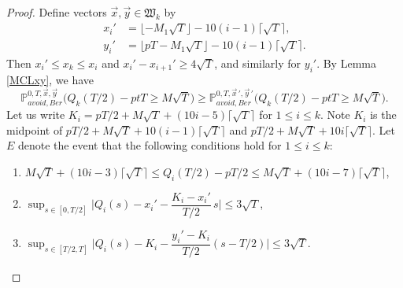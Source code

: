 \begin{proof}
	Define vectors $\vec{x},\vec{y}\in\mathfrak{W}_k$ by
	\begin{align*}
	x_i' &= \lfloor - M_1\sqrt{T} \rfloor - 10(i-1)\lceil\sqrt{T}\rceil,\\
	y_i' &= \lfloor pT - M_1\sqrt{T}\rfloor - 10(i-1)\lceil\sqrt{T}\rceil.
	\end{align*}
	Then $x_i'\leq x_k \leq x_i$ and $x_i'-x_{i+1}'\geq 4\sqrt{T}$, and similarly for $y_i'$. By Lemma \ref{MCLxy}, we have
	\begin{equation*}
	\mathbb{P}^{0,T,\vec{x},\vec{y}}_{avoid, Ber} \Big(Q_k(T/2) - ptT \geq M\sqrt{T}\Big) \geq \mathbb{P}^{0,T,\vec{x}\,',\vec{y}\,'}_{avoid, Ber} \Big(Q_k(T/2) - ptT \geq M\sqrt{T}\Big).
	\end{equation*}
	Let us write $K_i = pT/2 + M\sqrt{T}+(10i-5)\lceil\sqrt{T}\rceil$ for $1\leq i\leq k$. Note $K_i$ is the midpoint of $pT/2 + M\sqrt{T} + 10(i-1)\lceil\sqrt{T}\rceil$ and $pT/2 + M\sqrt{T}+10i\lceil\sqrt{T}\rceil$. Let $E$ denote the event that the following conditions hold for $1\leq i\leq k$:
	\begin{enumerate}[label=(\arabic*)]
		
		\item $M\sqrt{T}+(10i-3)\lceil\sqrt{T}\rceil \leq Q_i(T/2) - pT/2 \leq M\sqrt{T} + (10i-7)\lceil\sqrt{T}\rceil$,
		
		\item $\sup_{s\in[0,T/2]} \Big|Q_i(s)-x_i'-\dfrac{K_i-x_i'}{T/2}\,s\Big| \leq 3\sqrt{T}$,
		
		\item $\sup_{s\in[T/2,T]} \Big|Q_i(s)-K_i-\dfrac{y_i'-K_i}{T/2}(s-T/2)\Big| \leq 3\sqrt{T}$.
		

\end{enumerate}
\end{proof}
